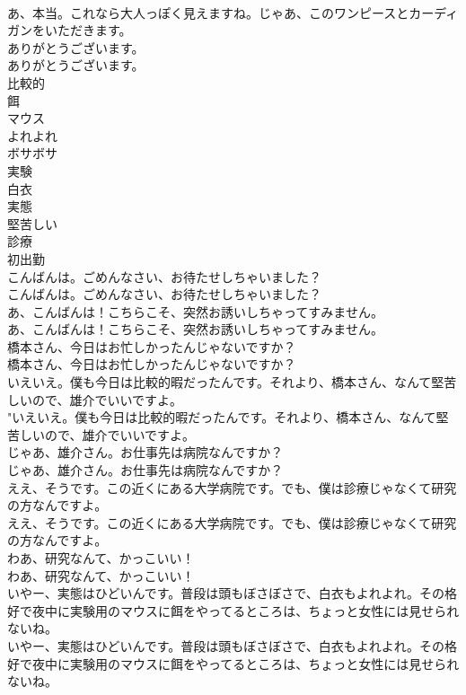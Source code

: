 \documentclass[8pt]{extreport}
\begin{document}
\begin{CJK}{UTF8}{min}
\\	あ、本当。これなら大人っぽく見えますね。じゃあ、このワンピースとカーディガンをいただきます。 
\\	ありがとうございます。	
\\	ありがとうございます。 
\\	比較的
\\	餌
\\	マウス
\\	よれよれ
\\	ボサボサ
\\	実験
\\	白衣
\\	実態
\\	堅苦しい
\\	診療
\\	初出勤
\\	こんばんは。ごめんなさい、お待たせしちゃいました？	
\\	こんばんは。ごめんなさい、お待たせしちゃいました？ 
\\	あ、こんばんは！こちらこそ、突然お誘いしちゃってすみません。	
\\	あ、こんばんは！こちらこそ、突然お誘いしちゃってすみません。 
\\	橋本さん、今日はお忙しかったんじゃないですか？	
\\	橋本さん、今日はお忙しかったんじゃないですか？ 
\\	いえいえ。僕も今日は比較的暇だったんです。それより、橋本さん、なんて堅苦しいので、雄介でいいですよ。	
\\	"いえいえ。僕も今日は比較的暇だったんです。それより、橋本さん、なんて堅苦しいので、雄介でいいですよ。 
\\	じゃあ、雄介さん。お仕事先は病院なんですか？	
\\	じゃあ、雄介さん。お仕事先は病院なんですか？ 
\\	ええ、そうです。この近くにある大学病院です。でも、僕は診療じゃなくて研究の方なんですよ。	
\\	ええ、そうです。この近くにある大学病院です。でも、僕は診療じゃなくて研究の方なんですよ。 
\\	わあ、研究なんて、かっこいい！	
\\	わあ、研究なんて、かっこいい！ 
\\	いやー、実態はひどいんです。普段は頭もぼさぼさで、白衣もよれよれ。その格好で夜中に実験用のマウスに餌をやってるところは、ちょっと女性には見せられないね。	
\\	いやー、実態はひどいんです。普段は頭もぼさぼさで、白衣もよれよれ。その格好で夜中に実験用のマウスに餌をやってるところは、ちょっと女性には見せられないね。 

\end{CJK}
\end{document}
